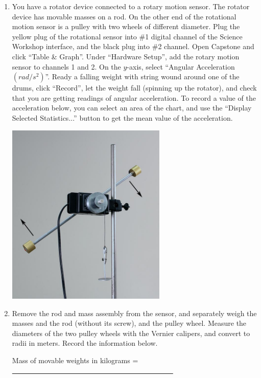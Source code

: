 \begin{enumerate}[label=\arabic*.]

\item You have a rotator device connected to a rotary motion sensor.  The rotator device has movable masses on a rod.  On the other end of the rotational motion sensor is a pulley with two wheels of different diameter.  Plug the yellow plug of the rotational sensor into \#1 digital channel of the Science Workshop interface, and the black plug into \#2 channel.  Open Capstone and click ``Table \& Graph''.  Under ``Hardware Setup'', add the rotary motion sensor to channels 1 and 2.  On the \(y\)-axis, select ``Angular Acceleration $(rad/s^2)$''.  Ready a falling weight with string wound around one of the drums, click ``Record'', let the weight fall (spinning up the rotator), and check that you are getting readings of angular acceleration.  To record a value of the acceleration below, you can select an area of the chart, and use the ``Display Selected Statistics...'' button to get the mean value of the acceleration.
\begin{center} \includegraphics*[width=0.6\textwidth]{imgs/6labs/6Alab/6Aexp7/IMG_5643_pdf.jpg} \end{center}

\item Remove the rod and mass assembly from the sensor, and separately weigh the masses and the rod (without its screw), and the pulley wheel.  Measure the diameters of the two pulley wheels with the Vernier calipers, and convert to radii in meters.  Record the information below.

Mass of movable weights in kilograms = \ul{~~~~~~~~~~~~~~~~~~~~~~~~~~~~~~~~~~~~~~~~~~~~~}


\end{enumerate}

